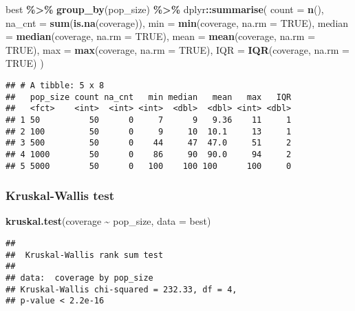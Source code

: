 \documentclass[
]{book}
\newenvironment{Shaded}{\begin{snugshade}}{\end{snugshade}}
\newcommand{\AttributeTok}[1]{\textcolor[rgb]{0.13,0.29,0.53}{#1}}
\newcommand{\ConstantTok}[1]{\textcolor[rgb]{0.56,0.35,0.01}{#1}}
\newcommand{\FunctionTok}[1]{\textcolor[rgb]{0.13,0.29,0.53}{\textbf{#1}}}
\newcommand{\NormalTok}[1]{#1}
\newcommand{\SpecialCharTok}[1]{\textcolor[rgb]{0.81,0.36,0.00}{\textbf{#1}}}
\begin{document}
\begin{Shaded}
\begin{Highlighting}[]
\NormalTok{best }\SpecialCharTok{\%\textgreater{}\%}
  \FunctionTok{group\_by}\NormalTok{(pop\_size) }\SpecialCharTok{\%\textgreater{}\%}
\NormalTok{  dplyr}\SpecialCharTok{::}\FunctionTok{summarise}\NormalTok{(}
    \AttributeTok{count =} \FunctionTok{n}\NormalTok{(),}
    \AttributeTok{na\_cnt =} \FunctionTok{sum}\NormalTok{(}\FunctionTok{is.na}\NormalTok{(coverage)),}
    \AttributeTok{min =} \FunctionTok{min}\NormalTok{(coverage, }\AttributeTok{na.rm =} \ConstantTok{TRUE}\NormalTok{),}
    \AttributeTok{median =} \FunctionTok{median}\NormalTok{(coverage, }\AttributeTok{na.rm =} \ConstantTok{TRUE}\NormalTok{),}
    \AttributeTok{mean =} \FunctionTok{mean}\NormalTok{(coverage, }\AttributeTok{na.rm =} \ConstantTok{TRUE}\NormalTok{),}
    \AttributeTok{max =} \FunctionTok{max}\NormalTok{(coverage, }\AttributeTok{na.rm =} \ConstantTok{TRUE}\NormalTok{),}
    \AttributeTok{IQR =} \FunctionTok{IQR}\NormalTok{(coverage, }\AttributeTok{na.rm =} \ConstantTok{TRUE}\NormalTok{)}
\NormalTok{  )}
\end{Highlighting}
\end{Shaded}

\begin{verbatim}
## # A tibble: 5 x 8
##   pop_size count na_cnt   min median   mean   max   IQR
##   <fct>    <int>  <int> <int>  <dbl>  <dbl> <int> <dbl>
## 1 50          50      0     7      9   9.36    11     1
## 2 100         50      0     9     10  10.1     13     1
## 3 500         50      0    44     47  47.0     51     2
## 4 1000        50      0    86     90  90.0     94     2
## 5 5000        50      0   100    100 100      100     0
\end{verbatim}

\hypertarget{kruskal-wallis-test-2}{%
\subsubsection{Kruskal-Wallis test}\label{kruskal-wallis-test-2}}

\begin{Shaded}
\begin{Highlighting}[]
\FunctionTok{kruskal.test}\NormalTok{(coverage }\SpecialCharTok{\textasciitilde{}}\NormalTok{ pop\_size, }\AttributeTok{data =}\NormalTok{ best)}
\end{Highlighting}
\end{Shaded}

\begin{verbatim}
## 
##  Kruskal-Wallis rank sum test
## 
## data:  coverage by pop_size
## Kruskal-Wallis chi-squared = 232.33, df = 4,
## p-value < 2.2e-16
\end{verbatim}
\end{document}

